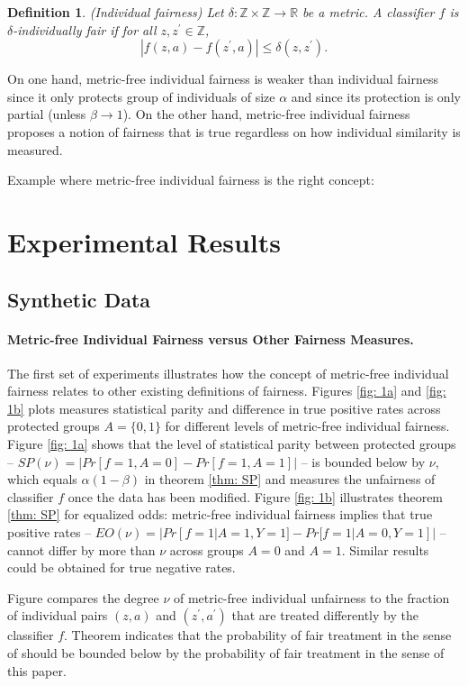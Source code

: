\documentclass{article}
\newtheorem{defn}{Definition}[section]
\begin{document}
\begin{defn}(Individual fairness)
Let $\delta:\mathbb{Z} \times \mathbb{Z} \rightarrow \mathbb{R}$ be a metric. A classifier $f$ is $\delta$-individually fair if for all $z, z^{'} \in \mathbb{Z}$, 
$$|f(z, a) - f(z^{'}, a)| \leq \delta(z, z^{'}).$$
\end{defn}

On one hand, metric-free individual fairness is weaker than individual fairness since it only protects group of individuals of size $\alpha$ and since its protection is only partial (unless $\beta \rightarrow 1$). On the other hand, metric-free individual fairness proposes a notion of fairness that is true regardless on how individual similarity is measured. 

\bigskip
Example where metric-free individual fairness is the right concept: 




\section{Experimental Results}
\subsection{Synthetic Data}
\paragraph{Metric-free Individual Fairness versus Other Fairness Measures.}
The first set of experiments illustrates how the concept of metric-free individual fairness relates to other existing definitions of fairness. Figures \ref{fig: 1a} and \ref{fig: 1b} plots measures statistical parity and  difference in true positive rates across protected groups $A=\{0, 1\}$ for different levels of metric-free individual fairness. Figure \ref{fig: 1a} shows that the level of statistical parity between protected groups -- $SP(\nu)=|Pr[f=1, A=0] - Pr[f=1, A=1]|$ -- is bounded below by $\nu$, which equals $\alpha(1-\beta)$ in theorem \ref{thm: SP} and measures the unfairness of classifier $f$ once the data has been modified. Figure \ref{fig: 1b} illustrates theorem \ref{thm: SP} for equalized odds: metric-free individual fairness implies that true positive rates -- $EO(\nu)= |Pr[f=1|A=1, Y=1] - Pr[f=1|A=0, Y=1]|$ -- cannot differ by more than $\nu$ across groups $A=0$ and $A=1$. Similar results could be obtained for true negative rates.

\bigskip
Figure compares the degree $\nu$ of metric-free individual unfairness to the fraction of individual pairs $(z, a)$ and $(z^{'}, a^{'})$ that are treated differently by the classifier $f$. Theorem indicates that the probability of fair treatment in the sense of \cite{dwork2012fairness} should be bounded below by the probability of fair treatment in the sense of this paper. 
\end{document}
